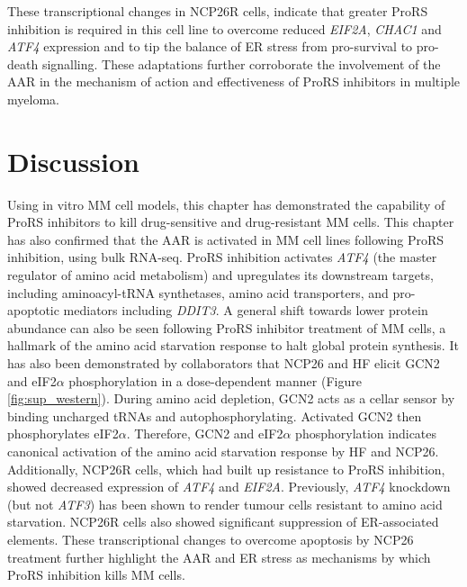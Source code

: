 These transcriptional changes in NCP26R cells, indicate that greater ProRS inhibition is required in this cell line to overcome reduced \textit{EIF2A}, \textit{CHAC1} and \textit{ATF4} expression and to tip the balance of ER stress from pro-survival to pro-death signalling.
These adaptations further corroborate the involvement of the AAR in the mechanism of action and effectiveness of ProRS inhibitors in multiple myeloma.

%

\afterpage{\clearpage}
\section{Discussion}
Using in vitro MM cell models, this chapter has demonstrated  the capability of ProRS inhibitors to kill drug-sensitive and drug-resistant MM cells.
This chapter has also confirmed that the AAR is activated in MM cell lines following ProRS inhibition, using bulk RNA-seq.
ProRS inhibition activates \textit{ATF4} (the master regulator of amino acid metabolism) and upregulates its downstream targets, including aminoacyl-tRNA synthetases, amino acid transporters, and pro-apoptotic mediators including \textit{DDIT3}.
A general shift towards lower protein abundance can also be seen following ProRS inhibitor treatment of MM cells, a hallmark of the amino acid starvation response to halt global protein synthesis.
It has also been demonstrated by collaborators that NCP26 and HF elicit GCN2 and eIF2$\alpha$ phosphorylation in a dose-dependent manner (Figure \ref{fig:sup_western}).
During amino acid depletion, GCN2 acts as a cellar sensor by binding uncharged tRNAs and autophosphorylating.
Activated GCN2 then phosphorylates eIF2$\alpha$\cite{battu2017amino}.
Therefore, GCN2 and eIF2$\alpha$ phosphorylation indicates canonical activation of the amino acid starvation response by HF and NCP26.
Additionally, NCP26R cells, which had built up resistance to ProRS inhibition, showed decreased expression of \textit{ATF4} and \textit{EIF2A}.
Previously, \textit{ATF4} knockdown (but not \textit{ATF3}) has been shown to render tumour cells resistant to amino acid starvation\cite{cheng2018arginine}.
NCP26R cells also showed significant suppression of ER-associated elements.
These transcriptional changes to overcome apoptosis by NCP26 treatment further highlight the AAR and ER stress as mechanisms by which ProRS inhibition kills MM cells.


